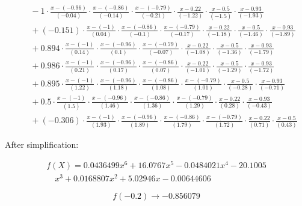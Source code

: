 \documentclass[12pt, a4paper]{article}
\numberwithin{equation}{section}
\begin{document}
\[
\begin{aligned}
& \quad -1 \cdot \frac{{x - (-0.96)}}{{(-0.04)}} \cdot \frac{{x - (-0.86)}}{{(-0.14)}} \cdot \frac{{x - (-0.79)}}{{(-0.21)}} \cdot \frac{{x - 0.22}}{{(-1.22)}} \cdot \frac{{x - 0.5}}{{(-1.5)}} \cdot \frac{{x - 0.93}}{{(-1.93)}} \\
& \quad + (-0.151) \cdot \frac{{x - (-1)}}{{(0.04)}} \cdot \frac{{x - (-0.86)}}{{(-0.1)}} \cdot \frac{{x - (-0.79)}}{{(-0.17)}} \cdot \frac{{x - 0.22}}{{(-1.18)}} \cdot \frac{{x - 0.5}}{{(-1.46)}} \cdot \frac{{x - 0.93}}{{(-1.89)}} \\
& \quad + 0.894 \cdot \frac{{x - (-1)}}{{(0.14)}} \cdot \frac{{x - (-0.96)}}{{(0.1)}} \cdot \frac{{x - (-0.79)}}{{(-0.07)}} \cdot \frac{{x - 0.22}}{{(-1.08)}} \cdot \frac{{x - 0.5}}{{(-1.36)}} \cdot \frac{{x - 0.93}}{{(-1.79)}} \\
& \quad + 0.986 \cdot \frac{{x - (-1)}}{{(0.21)}} \cdot \frac{{x - (-0.96)}}{{(0.17)}} \cdot \frac{{x - (-0.86)}}{{(0.07)}} \cdot \frac{{x - 0.22}}{{(-1.01)}} \cdot \frac{{x - 0.5}}{{(-1.29)}} \cdot \frac{{x - 0.93}}{{(-1.72)}} \\
& \quad + 0.895 \cdot \frac{{x - (-1)}}{{(1.22)}} \cdot \frac{{x - (-0.96)}}{{(1.18)}} \cdot \frac{{x - (-0.86)}}{{(1.08)}} \cdot \frac{{x - (-0.79)}}{{(1.01)}} \cdot \frac{{x - 0.5}}{{(-0.28)}} \cdot \frac{{x - 0.93}}{{(-0.71)}} \\
& \quad + 0.5 \cdot \frac{{x - (-1)}}{{(1.5)}} \cdot \frac{{x - (-0.96)}}{{(1.46)}} \cdot \frac{{x - (-0.86)}}{{(1.36)}} \cdot \frac{{x - (-0.79)}}{{(1.29)}} \cdot \frac{{x - 0.22}}{{(0.28)}} \cdot \frac{{x - 0.93}}{{(-0.43)}} \\
& \quad + (-0.306) \cdot \frac{{x - (-1)}}{{(1.93)}} \cdot \frac{{x - (-0.96)}}{{(1.89)}} \cdot \frac{{x - (-0.86)}}{{(1.79)}} \cdot \frac{{x - (-0.79)}}{{(1.72)}} \cdot \frac{{x - 0.22}}{{(0.71)}} \cdot \frac{{x - 0.5}}{{(0.43)}}
\end{aligned}
\]

After simplification:

\begin{equation}
\begin{split}
    f(X) = 0.0436499 x^6+16.0767 x^5-0.0484021 x^4-20.1005 \\
    \quad x^3+0.0168807 x^2+5.02946 x-0.00644606
\end{split}
\end{equation}

\begin{equation}
f(-0.2)\to -0.856079
\end{equation}
\end{document}
